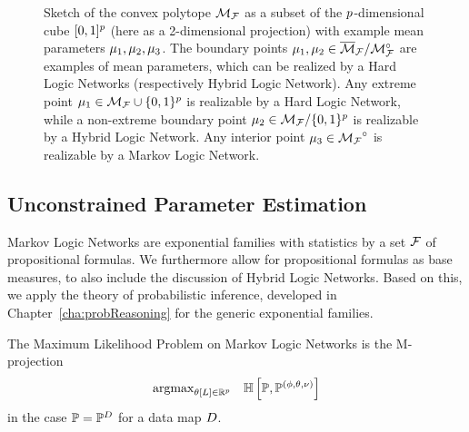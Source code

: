\begin{figure}[h]\label{fig:meansetSketch}
\begin{center}
	
\end{center}
\caption{Sketch of the convex polytope ${\mathcal{M}_{\mathcal{F}}}$ as a subset of the $p$-dimensional cube $[0,1]^p$ (here as a 2-dimensional projection) with example mean 	parameters $\mu_1,\mu_2,\mu_3$.
	The boundary points $\mu_1,\mu_2\in\overline{\mathcal{M}}_{\mathcal{F}}/{\mathcal{M}}^{\circ}_{\mathcal{F}}$ are examples of mean parameters, which can be realized by a Hard Logic Networks (respectively Hybrid Logic Network). 
	Any extreme point $\mu_1\in\mathcal{M}_{\mathcal{F}}\cup\{0,1\}^{p}$ is realizable by a Hard Logic Network, while a non-extreme boundary point $\mu_2\in\mathcal{M}_{\mathcal{F}}/\{0,1\}^{p}$ is realizable by a Hybrid Logic Network.
	Any interior point $\mu_3\in{\mathcal{M}_{\mathcal{F}}}^{\circ}$ is realizable by a Markov Logic Network.
} 
\end{figure}




\subsection{Unconstrained Parameter Estimation} \label{sec:parameterEstimation} %

Markov Logic Networks are exponential families with statistics by a set $\mathcal{F}$ of propositional formulas.
We furthermore allow for propositional formulas as base measures, to also include the discussion of Hybrid Logic Networks.
Based on this, we apply the theory of probabilistic inference, developed in Chapter~\ref{cha:probReasoning} for the generic exponential families.

The Maximum Likelihood Problem on Markov Logic Networks is the M-projection
\begin{align*}
	\mathrm{argmax}_{\theta\left[L\right]\in\mathbb{R}^{p}} \quad 
	\mathbb{H}\left[\mathbb{P},\mathbb{P}^{(\phi,\theta,\nu)}\right]	
\end{align*}
in the case $\mathbb{P}=\mathbb{P}^{D}$ for a data map $D$.

